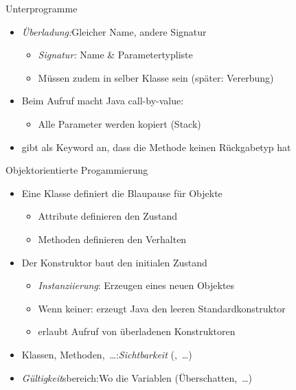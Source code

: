 {\begin{frame}[c]{Unterprogramme}
\begin{itemize}[<+(1)->]
   \itemsep18pt
   \item \textit{Überladung:}\quad\pause Gleicher Name, andere Signatur \begin{itemize}
      \item \textit{Signatur:} \pause Name \& Parametertypliste
      \item Müssen zudem in selber Klasse sein (später: Vererbung)
   \end{itemize}
   \item Beim Aufruf macht Java call-by-value: \begin{itemize}
      \item Alle Parameter werden kopiert (Stack)
   \end{itemize}
   \item {} gibt als Keyword an, dass die Methode keinen Rückgabetyp hat
\end{itemize}
\end{frame}

\begin{frame}[c]{Objektorientierte Progammierung}
\begin{itemize}[<+(1)->]
   \itemsep18pt
   \item Eine Klasse definiert die Blaupause für Objekte \begin{itemize}
      \item Attribute definieren den Zustand
      \item Methoden definieren den Verhalten
   \end{itemize}
   \item Der Konstruktor baut den initialen Zustand \begin{itemize}
      \item \textit{Instanziierung}: \pause Erzeugen eines neuen Objektes
      \item Wenn keiner: \pause erzeugt Java den leeren Standardkonstruktor
      \item {} erlaubt Aufruf von überladenen Konstruktoren
   \end{itemize}
   \item Klassen, Methoden,~\ldots:\quad \textit{Sichtbarkeit} (,~\ldots)
   \item \textit{Gültigkeit}sbereich:\quad Wo die Variablen  (Überschatten,~\ldots)
\end{itemize}
\end{frame}
}\fi

